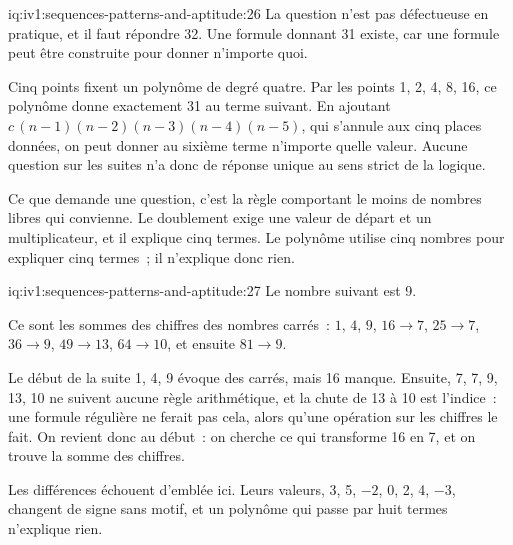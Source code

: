 \begin{solution}{iq:iv1:sequences-patterns-and-aptitude:26}
La question n'est pas défectueuse en pratique, et il faut répondre 32. Une formule donnant 31 existe, car une formule peut être construite pour donner n'importe quoi.

Cinq points fixent un polynôme de degré quatre. Par les points 1, 2, 4, 8, 16, ce polynôme donne exactement 31 au terme suivant. En ajoutant $c\,(n - 1)(n - 2)(n - 3)(n - 4)(n - 5)$, qui s'annule aux cinq places données, on peut donner au sixième terme n'importe quelle valeur. Aucune question sur les suites n'a donc de réponse unique au sens strict de la logique.

Ce que demande une question, c'est la règle comportant le moins de nombres libres qui convienne. Le doublement exige une valeur de départ et un multiplicateur, et il explique cinq termes. Le polynôme utilise cinq nombres pour expliquer cinq termes~; il n'explique donc rien.

\end{solution}

\enlargethispage{-3\baselineskip}%
\begin{solution}{iq:iv1:sequences-patterns-and-aptitude:27}
Le nombre suivant est 9.

Ce sont les sommes des chiffres des nombres carrés~: $1$, $4$, $9$, $16 \to 7$, $25 \to 7$, $36 \to 9$, $49 \to 13$, $64 \to 10$, et ensuite $81 \to 9$.

Le début de la suite 1, 4, 9 évoque des carrés, mais 16 manque. Ensuite, 7, 7, 9, 13, 10 ne suivent aucune règle arithmétique, et la chute de 13 à 10 est l'indice~: une formule régulière ne ferait pas cela, alors qu'une opération sur les chiffres le fait. On revient donc au début~: on cherche ce qui transforme 16 en 7, et on trouve la somme des chiffres.

Les différences échouent d'emblée ici. Leurs valeurs, 3, 5, $-2$, 0, 2, 4, $-3$, changent de signe sans motif, et un polynôme qui passe par huit termes n'explique rien.

\end{solution}

